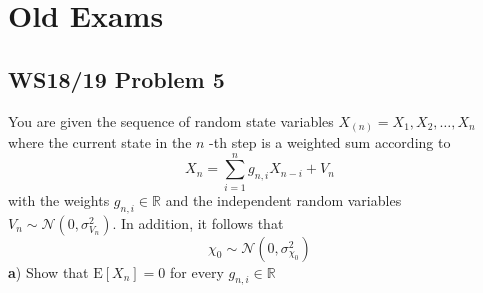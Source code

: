 \documentclass[english]{latex4ei/latex4ei_sheet}
\begin{document}
\section{Old Exams}
\begin{sectionbox}
\subsection{WS18/19 Problem 5}
You are given the sequence of random state variables $X_{(n)}=X_{1}, X_{2}, \ldots, X_{n}$ where the current state in the $n$ -th step is a weighted sum according to
$$
X_{n}=\sum_{i=1}^{n} g_{n, i} X_{n-i}+V_{n}
$$
with the weights $g_{n, i} \in \mathbb{R}$ and the independent random variables $V_{n} \sim \mathcal{N}\left(0, \sigma_{V_{n}}^{2}\right) .$ In addition, it follows that
$$
\chi_{0} \sim \mathcal{N}\left(0, \sigma_{\chi_{0}}^{2}\right)
$$
\textbf{a}) Show that $\mathrm{E}\left[X_{n}\right]=0$ for every $g_{n, i} \in \mathbb{R}$
\end{sectionbox}


\end{document}
